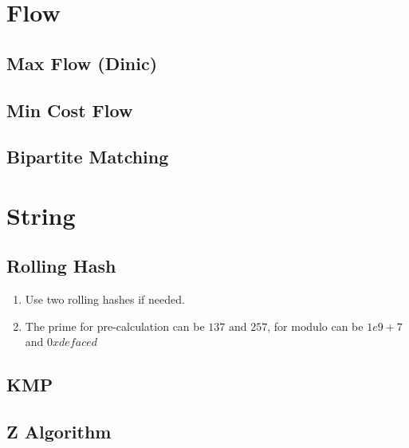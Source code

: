 \documentclass[10pt,oneside]{article}
\begin{document}
\begin{landscape}
\begin{multicols}{2}
\section{Flow}

\subsection{Max Flow (Dinic)}

\subsection{Min Cost Flow}

\subsection{Bipartite Matching}


\section{String}

\subsection{Rolling Hash}

\begin{enumerate}
	\item Use two rolling hashes if needed.  
	\item The prime for pre-calculation can be $137$ and $257$, for modulo can be $1e9 + 7$ and $0xdefaced$ 
\end{enumerate}


\subsection{KMP}


\subsection{Z Algorithm}


\end{multicols}
\end{landscape}
\end{document}
